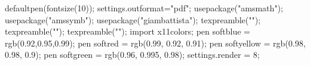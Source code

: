 
\begin{asydef} 
defaultpen(fontsize(10));
settings.outformat="pdf";
usepackage("amsmath");
usepackage("amssymb"); 
usepackage("giambattista");
texpreamble("\renewcommand{\vec}[1]{\mathbf{#1}}");
texpreamble("\let\e\relax");
texpreamble("\DeclareMathOperator{\e}{e}"); 
import x11colors;
pen softblue = rgb(0.92,0.95,0.99);
pen softred = rgb(0.99, 0.92, 0.91);
pen softyellow = rgb(0.98, 0.98, 0.9);
pen softgreen = rgb(0.96, 0.995, 0.98);
settings.render = 8; 
\end{asydef}

\newsavebox{\asybox}
\def\asydir{asy3d}

\makeatletter                       
\def\printauthor{%
  {\large \@author}}              
\makeatother

\author{\Large \textit{Samuel S.\ Watson}}

\newcommand{\milink}[3][-7.5mm]{\sidenote{\href{http://mathinsight.org/#2}{\mi} on #3}[#1]}
\newcommand\cocalc[1][-2pt]{\raisebox{#1}{\texttt{[image: figures/cocalc\_new]}}}
\newcommand\tbob[1][-2pt]{\raisebox{#1}{\texttt{[image: figures/3b1b\_new]}}}
\newcommand\mi[1][-2pt]{\raisebox{#1}{\texttt{[image: figures/mathinsight]}}}



\usetikzlibrary{decorations.fractals}

